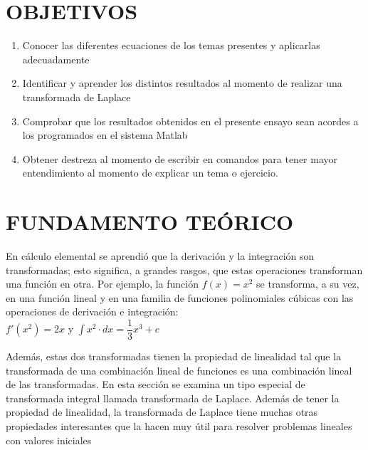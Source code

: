\documentclass[12pt,a4paper]{article}
\begin{document}
\vspace{0.3cm}
\section{OBJETIVOS}
\begin{enumerate}
\item Conocer las diferentes ecuaciones de los temas presentes y aplicarlas adecuadamente

\item Identificar y aprender los distintos resultados al momento de realizar una transformada de Laplace

\item Comprobar que los resultados obtenidos en el presente ensayo sean acordes a los programados en el sistema Matlab

\item Obtener destreza al momento de escribir en comandos para tener mayor entendimiento al momento de explicar un tema o ejercicio.

\end{enumerate}

\vspace{0.3cm}
\section{FUNDAMENTO TEÓRICO}
En cálculo elemental se aprendió que la derivación y la integración son transformadas; esto significa, a grandes rasgos, que estas operaciones transforman una función en otra. Por ejemplo, la función $f(x)= x^{2}$ se transforma, a su vez, en una función lineal y en una familia de funciones polinomiales cúbicas con las operaciones de derivación e integración:\\

$f'(x^{2}) = 2x$   \hspace{0.4cm} y \hspace{0.4cm}   $  \displaystyle\int x^{2} \cdot dx = \dfrac{1}{3}x^{3}+c $

Además, estas dos transformadas tienen la propiedad de linealidad tal que la transformada de una combinación lineal de funciones es una combinación lineal de las transformadas. En esta sección se examina un tipo especial de transformada integral llamada transformada de Laplace. Además de tener la propiedad de linealidad, la transformada de Laplace tiene muchas otras propiedades interesantes que la hacen muy útil para resolver problemas lineales con valores iniciales

\vspace{0.2cm}
\end{document}
